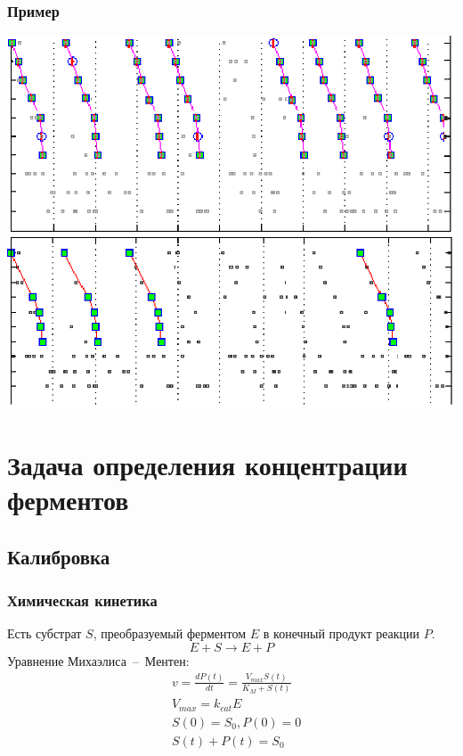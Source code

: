 \documentclass[smaller]{beamer}
\begin{document}
\begin{frame}
  \frametitle{ Пример }
       \includegraphics[scale=0.6]{comp.eps} 
\end{frame}

\section{Задача определения концентрации ферментов}
\subsection{Калибровка}
\begin{frame}
  \frametitle{Химическая кинетика}
  Есть субстрат $S$, преобразуемый ферментом $E$ в конечный продукт реакции $P$.
  $$ E+S\rightarrow E+P$$
  Уравнение Михаэлиса~--~Ментен:
  $$
    \begin{align}
     & v=\frac{dP(t)}{dt}=\frac{V_{max}S(t)}{K_M+S(t)}\\
     & V_{max}=k_{cat}E \\
     & S(0)=S_0, P(0)=0 \\
     & S(t)+P(t)=S_0 
     \end{align}
  $$
\end{frame}
\end{document}
